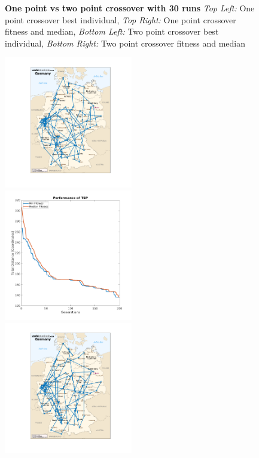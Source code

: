 \documentclass{article}
\begin{document}
\begin{figure}[h!]
		\caption
		{
		\textbf{One point vs two point crossover with 30 runs}\newline
		\textit{Top Left:} One point crossover best individual,
		\textit{Top Right:} One point crossover fitness and median, 
		\textit{Bottom Left:} Two point crossover best individual, 
		\textit{Bottom Right:} Two point crossover fitness and median
		}
		\end{figure}
		
		\begin{figure}[h!]
		\includegraphics[width=0.5\textwidth]{img/cross_80_mut_10_ind.png}
		\includegraphics[width=0.5\textwidth]{img/cross_80_mut_10_fit_med.png}
		\includegraphics[width=0.5\textwidth]{img/cross_80_mut_10_ind_30_runs.png}

\end{figure}
\end{document}
